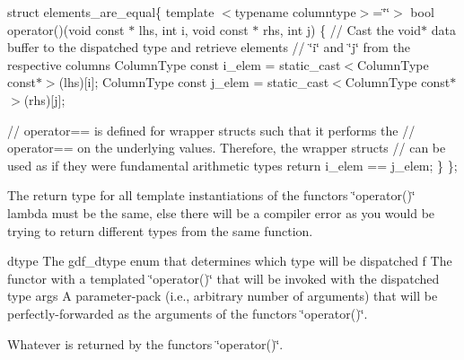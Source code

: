 struct elements\+\_\+are\+\_\+equal\{ template $<$typename columntype$>$=\char`\"{}\char`\"{}$>$ bool operator()(void const $\ast$ lhs, int i, void const $\ast$ rhs, int j) \{ // Cast the void$\ast$ data buffer to the dispatched type and retrieve elements // \char`\"{}i\char`\"{} and \char`\"{}j\char`\"{} from the respective columns Column\+Type const i\+\_\+elem = static\+\_\+cast$<$\+Column\+Type const$\ast$$>$(lhs)\mbox{[}i\mbox{]}; Column\+Type const j\+\_\+elem = static\+\_\+cast$<$\+Column\+Type const$\ast$$>$(rhs)\mbox{[}j\mbox{]};

// operator== is defined for wrapper structs such that it performs the // operator== on the underlying values. Therefore, the wrapper structs // can be used as if they were fundamental arithmetic types return i\+\_\+elem == j\+\_\+elem; \} \};

The return type for all template instantiations of the functor\textquotesingle{}s \char`\"{}operator()\char`\"{} lambda must be the same, else there will be a compiler error as you would be trying to return different types from the same function.

dtype The gdf\+\_\+dtype enum that determines which type will be dispatched  f The functor with a templated \char`\"{}operator()\char`\"{} that will be invoked with the dispatched type  args A parameter-\/pack (i.\+e., arbitrary number of arguments) that will be perfectly-\/forwarded as the arguments of the functor\textquotesingle{}s \char`\"{}operator()\char`\"{}.

Whatever is returned by the functor\textquotesingle{}s \char`\"{}operator()\char`\"{}. 